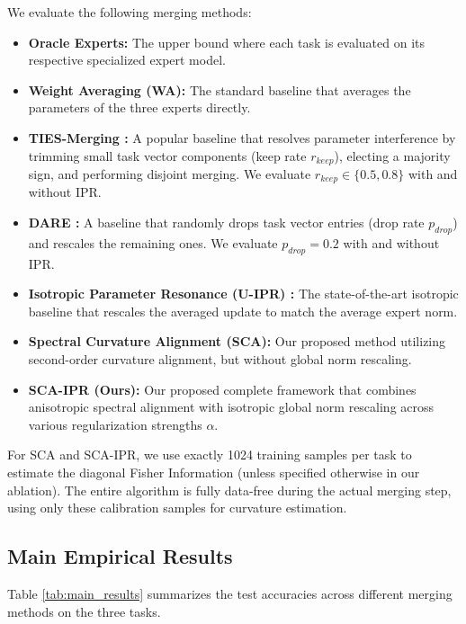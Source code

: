 \documentclass{article}
\theoremstyle{plain}
\theoremstyle{definition}
\theoremstyle{remark}
\begin{document}
We evaluate the following merging methods:
\begin{itemize}
    \item \textbf{Oracle Experts:} The upper bound where each task is evaluated on its respective specialized expert model.
    \item \textbf{Weight Averaging (WA):} The standard baseline that averages the parameters of the three experts directly.
    \item \textbf{TIES-Merging \cite{yadav2023ties}:} A popular baseline that resolves parameter interference by trimming small task vector components (keep rate $r_{keep}$), electing a majority sign, and performing disjoint merging. We evaluate $r_{keep} \in \{0.5, 0.8\}$ with and without IPR.
    \item \textbf{DARE \cite{yu2023language}:} A baseline that randomly drops task vector entries (drop rate $p_{drop}$) and rescales the remaining ones. We evaluate $p_{drop} = 0.2$ with and without IPR.
    \item \textbf{Isotropic Parameter Resonance (U-IPR) \cite{sub9_ipr}:} The state-of-the-art isotropic baseline that rescales the averaged update to match the average expert norm.
    \item \textbf{Spectral Curvature Alignment (SCA):} Our proposed method utilizing second-order curvature alignment, but without global norm rescaling.
    \item \textbf{SCA-IPR (Ours):} Our proposed complete framework that combines anisotropic spectral alignment with isotropic global norm rescaling across various regularization strengths $\alpha$.
\end{itemize}
For SCA and SCA-IPR, we use exactly 1024 training samples per task to estimate the diagonal Fisher Information (unless specified otherwise in our ablation). The entire algorithm is fully data-free during the actual merging step, using only these calibration samples for curvature estimation.

\subsection{Main Empirical Results}
\label{subsec:results}

Table \ref{tab:main_results} summarizes the test accuracies across different merging methods on the three tasks.
\end{document}
